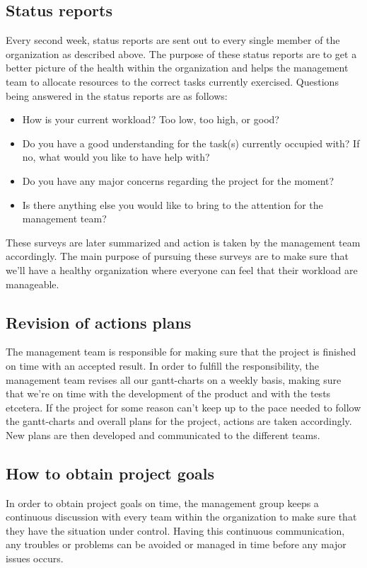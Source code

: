 \subsection{Status reports}
Every second week, status reports are sent out to every single member of the organization as described above. The purpose of these status reports are to get a better picture of the health within the organization and helps the management team to allocate resources to the correct tasks currently exercised. Questions being answered in the status reports are as follows:

\begin{itemize}
    \item How is your current workload? Too low, too high, or good?
    \item Do you have a good understanding for the task(s) currently occupied with? If no, what would you like to have help with?
    \item Do you have any major concerns regarding the project for the moment?
    \item Is there anything else you would like to bring to the attention for the management team?
\end{itemize}

These surveys are later summarized and action is taken by the management team accordingly. The main purpose of pursuing these surveys are to make sure that we'll have a healthy organization where everyone can feel that their workload are manageable. 

\subsection{Revision of actions plans}
The management team is responsible for making sure that the project is finished on time with an accepted result. In order to fulfill the responsibility, the management team revises all our gantt-charts on a weekly basis, making sure that we're on time with the development of the product and with the tests etcetera. If the project for some reason can't keep up to the pace needed to follow the gantt-charts and overall plans for the project, actions are taken accordingly. New plans are then developed and communicated to the different teams. 

\subsection{How to obtain project goals}
In order to obtain project goals on time, the management group keeps a continuous discussion with every team within the organization to make sure that they have the situation under control. Having this continuous communication, any troubles or problems can be avoided or managed in time before any major issues occurs. 